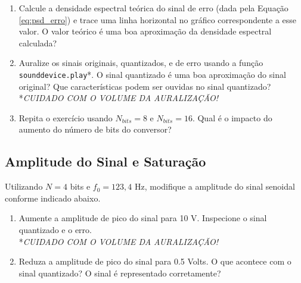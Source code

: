 \documentclass[a4paper,twoside,12pt]{article}
\begin{document}
\begin{enumerate}
\begin{lstlisting}[frame=single]
# numero de pontos entre f=0 e f=fs
Ndft = 1024

# f: frequencias [Hz] / Sxx: densidade espectral de potencia [V^2/Hz]
f, Sxx = ss.welch(sinal, fs, 'hann', nperseg=Ndft,
        noverlap=Ndft//2, scaling='density')

# plotar Sxx com escala vertical logaritmica
plt.figure()
plt.semilogy(f, Sxx)
\end{lstlisting} 
		Calcule e plote a densidade espectral de potência do sinal original, do sinal quantizado, e do sinal de erro. O espectro do sinal quantizado é uma boa aproximação do espectro do sinal original? Como o espectro do sinal de erro está distribuído na frequência?
		
		\item Calcule a densidade espectral teórica do sinal de erro (dada pela Equação \ref{eq:psd_erro}) e trace uma linha horizontal no gráfico correspondente a esse valor. O valor teórico é uma boa aproximação da densidade espectral calculada?
	
		\item Auralize os sinais originais, quantizados, e de erro usando a função {\tt sounddevice.play}*. O sinal quantizado é uma boa aproximação do sinal original? Que características podem ser ouvidas no sinal quantizado?\\
		*\emph{CUIDADO COM O VOLUME DA AURALIZAÇÃO!}
		
		\item Repita o exercício usando $N_{bits}=8$ e $N_{bits}=16$. Qual é o impacto do aumento do número de bits do conversor?
	
	\end{enumerate}

	\subsection{Amplitude do Sinal e Saturação}
	\label{sec:ex2}
	
	Utilizando $N = 4$ bits e $f_0 = 123{,}4$ Hz, modifique a amplitude do sinal senoidal conforme indicado abaixo.
	
	\begin{enumerate}
		\item Aumente a amplitude de pico do sinal para 10 V. Inspecione o sinal quantizado e o erro.\\
		*\emph{CUIDADO COM O VOLUME DA AURALIZAÇÃO!}
		
		\item Reduza a amplitude de pico do sinal para 0.5 Volts. O que acontece com o sinal quantizado? O sinal é representado corretamente?
	\end{enumerate}
	
\end{document}
